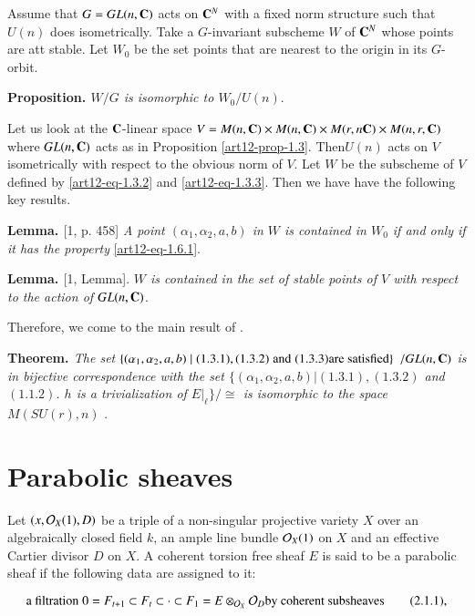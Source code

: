 Assume that $G=GL(n,\mathbf{C})$ acts on $\mathbf{C}^{N}$ with a fixed norm structure such that $U(n)$ does isometrically. Take a $G$-invariant subscheme $W$ of $\mathbf{C}^{N}$ whose points are att stable. Let $W_{0}$ be the set points that are nearest to the origin in its $G$-orbit.

\medskip
\noindent
{\bfseries {} Proposition. \label{art12-prop-1.7}} \textit{$W/G$ is isomorphic to $W_{0}/U(n)$}.

Let us look at the $\mathbf{C}$-linear space $V=M(n,\mathbf{C}) \times M(n,\mathbf{C}) \times M(r,n \mathbf{C})\times M(n,r,\mathbf{C})$ where $GL(n,\mathbf{C})$ acts as in Proposition \ref{art12-prop-1.3}. Then$U(n)$ acts on $V$ isometrically with respect to the obvious norm of $V$. Let $W$ be the subscheme of $V$ defined by \eqref{art12-eq-1.3.2} and \eqref{art12-eq-1.3.3}. Then we have have the following key results. 

\medskip
\noindent
{\bfseries {} Lemma. \label{art12-Lemma-1.8}} [1, p. 458] \textit{A point $(\alpha_{1}, \alpha_{2}, a, b)$ in $W$ is contained in $W_{0}$ if and only if it has the property} \eqref{art12-eq-1.6.1}.

\medskip
\noindent
{\bfseries {} Lemma. \label{art12-Lemma-1.9}} [1, Lemma]. \textit{$W$ is contained in the set of stable points of $V$ with respect to the action of $GL(n,\mathbf{C})$}.

Therefore, we come to the main result of \cite{art12-key1}.

\medskip
\noindent
{\bfseries {} Theorem. \label{art12-Thm-1.10}} \textit{The set $\{(\alpha_{1}, \alpha_{2}, a, b)\; | \;(1.3.1), (1.3.2)\; \text{and} \;(1.3.3)\break \text{are satisfied} \}$ $/GL(n,\mathbf{C})$ is in bijective correspondence with the set \break $\{(\alpha_{1}, \alpha_{2}, a, b) | (1.3.1), (1.3.2)$ {\rm and} $(1.1.2)$. $h$ {\rm is a trivialization of} $E|_{\ell}\}/\cong$  is isomorphic to the space $M(SU(r),n)$ }.

\section{Parabolic sheaves}\label{art12-sec-2}
Let $(x, \mathcal{O}_{X}(1), D)$ be a triple of a non-singular projective variety $X$ over an algebraically closed field $k$, an ample line bundle $\mathcal{O}_{X}(1)$ on $X$ and an effective  Cartier divisor $D$ on $X$. A coherent torsion free sheaf $E$ is said to be a parabolic sheaf if the following data are assigned to it:

\begin{equation}
\text{a filtration}\; 0 = F_{t+1} \subset F_{t} \subset \cdot \subset F_{1} = E \otimes_{\mathcal{O}_{X}}\mathcal{O}_{D}
\text{by coherent subsheaves}\tag{2.1.1}\label{art12-eq-2.1.1},
\end{equation}

